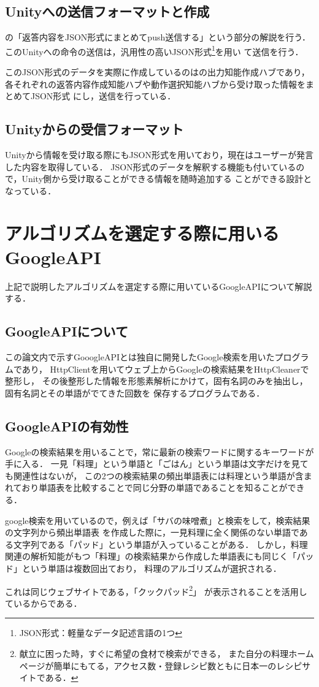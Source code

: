 \subsection{Unityへの送信フォーマットと作成}
の「返答内容をJSON形式にまとめてpush送信する」という部分の解説を行う．
このUnityへの命令の送信は，汎用性の高いJSON形式\footnote{JSON形式：軽量なデータ記述言語の1つ}を用い
て送信を行う．

このJSON形式のデータを実際に作成しているのはの出力知能作成ハブであり，
各それぞれの返答内容作成知能ハブや動作選択知能ハブから受け取った情報をまとめてJSON形式
にし，送信を行っている．

\subsection{Unityからの受信フォーマット}
Unityから情報を受け取る際にもJSON形式を用いており，現在はユーザーが発言した内容を取得している．
JSON形式のデータを解釈する機能も付いているので，Unity側から受け取ることができる情報を随時追加する
ことができる設計となっている．
\newpage
\section{アルゴリズムを選定する際に用いるGoogleAPI}
上記で説明したアルゴリズムを選定する際に用いているGoogleAPIについて解説する．

\subsection{GoogleAPIについて}
この論文内で示すGooogleAPIとは独自に開発したGoogle検索を用いたプログラムであり，
HttpClientを用いてウェブ上からGoogleの検索結果をHttpCleanerで整形し，
その後整形した情報を形態素解析にかけて，固有名詞のみを抽出し，固有名詞とその単語がでてきた回数を
保存するプログラムである．

\subsection{GoogleAPIの有効性}
Googleの検索結果を用いることで，常に最新の検索ワードに関するキーワードが手に入る．
一見「料理」という単語と「ごはん」という単語は文字だけを見ても関連性はないが，
この2つの検索結果の頻出単語表には料理という単語が含まれており単語表を比較することで同じ分野の単語であることを知ることができる．

google検索を用いているので，例えば「サバの味噌煮」と検索をして，検索結果の文字列から頻出単語表
を作成した際に，一見料理に全く関係のない単語である文字列である「パッド」という単語が入っていることがある．
しかし，料理関連の解析知能がもつ「料理」の検索結果から作成した単語表にも同じく「パッド」という単語は複数回出ており，
料理のアルゴリズムが選択される．

これは同じウェブサイトである，「クックパッド\footnote{献立に困った時，すぐに希望の食材で検索ができる，
また自分の料理ホームページが簡単にもてる，アクセス数・登録レシピ数ともに日本一のレシピサイトである．}」
が表示されることを活用しているからである．